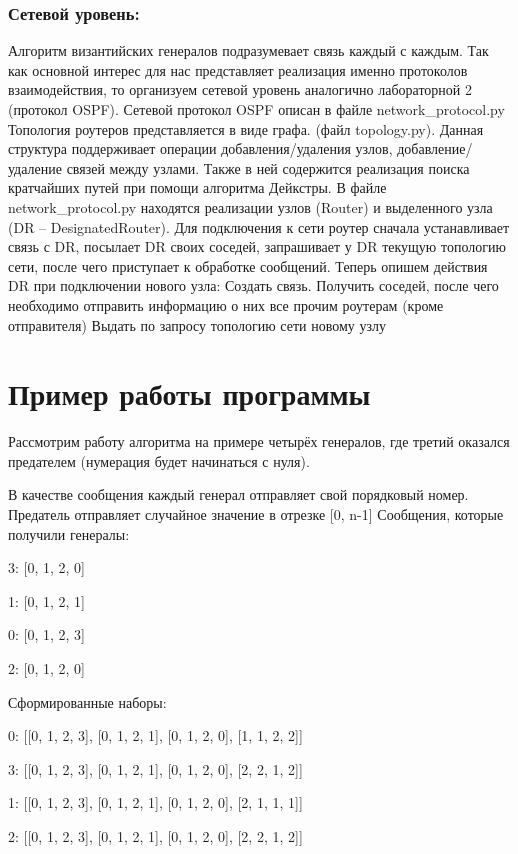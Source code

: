 \documentclass[a4paper,12pt]{article}
\begin{document}
\subsubsection{Сетевой уровень:}

Алгоритм византийских генералов подразумевает связь каждый с каждым. Так как
основной интерес для нас представляет реализация именно протоколов взаимодействия, то
организуем сетевой уровень аналогично лабораторной 2 (протокол OSPF).
Сетевой протокол OSPF описан в файле network\_protocol.py
Топология роутеров представляется в виде графа. (файл topology.py). Данная
структура поддерживает операции добавления/удаления узлов, добавление/удаление связей
между узлами. Также в ней содержится реализация поиска кратчайших путей при помощи
алгоритма Дейкстры.
В файле network\_protocol.py находятся реализации узлов (Router) и выделенного
узла (DR – DesignatedRouter). Для подключения к сети роутер сначала устанавливает связь
с DR, посылает DR своих соседей, запрашивает у DR текущую топологию сети, после чего
приступает к обработке сообщений.
Теперь опишем действия DR при подключении нового узла:
Создать связь.
Получить соседей, после чего необходимо отправить информацию о них все
прочим роутерам (кроме отправителя)
Выдать по запросу топологию сети новому узлу

\section{Пример работы программы}

Рассмотрим работу алгоритма на примере четырёх генералов, где третий оказался
предателем (нумерация будет начинаться с нуля).

В качестве сообщения каждый генерал отправляет свой порядковый номер.
Предатель отправляет случайное значение в отрезке [0, n-1]
Сообщения, которые получили генералы:

3: [0, 1, 2, 0]

1: [0, 1, 2, 1]

0: [0, 1, 2, 3]

2: [0, 1, 2, 0]

Сформированные наборы:

0: [[0, 1, 2, 3], [0, 1, 2, 1], [0, 1, 2, 0], [1, 1, 2, 2]]

3: [[0, 1, 2, 3], [0, 1, 2, 1], [0, 1, 2, 0], [2, 2, 1, 2]]

1: [[0, 1, 2, 3], [0, 1, 2, 1], [0, 1, 2, 0], [2, 1, 1, 1]]

2: [[0, 1, 2, 3], [0, 1, 2, 1], [0, 1, 2, 0], [2, 2, 1, 2]]
\end{document}
